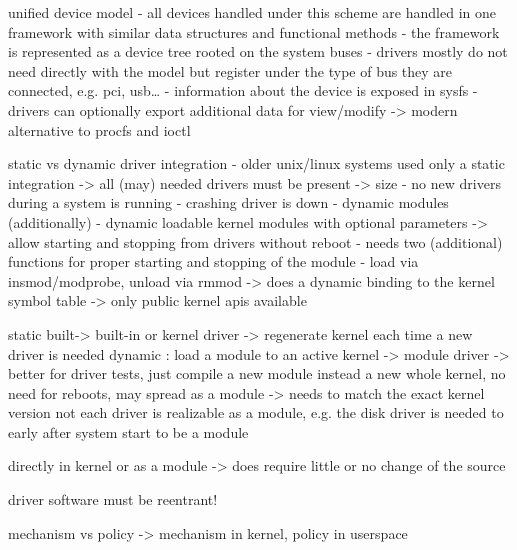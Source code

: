 \cite{lfd430}
unified device model
- all devices handled under this scheme are handled in one framework with similar data structures and functional methods
- the framework is represented as a device tree rooted on the system buses
- drivers mostly do not need directly with the model but register under the type of bus they are connected, e.g. pci, usb\ldots
- information about the device is exposed in sysfs
- drivers can optionally export additional data for view/modify -> modern alternative to procfs and ioctl



static vs dynamic driver integration
- older unix/linux systems used only a static integration -> all (may) needed drivers must be present -> size
    - no new drivers during a system is running
    - crashing driver is down
- dynamic modules (additionally) 
    - dynamic loadable kernel modules with optional parameters -> allow starting and stopping from drivers without reboot
    - needs two (additional) functions for proper starting and stopping of the module
    - load via insmod/modprobe, unload via rmmod -> does a dynamic binding to the kernel symbol table -> only public kernel apis available

\cite{quade2016Linux}
    static built-> built-in or kernel driver -> regenerate kernel each time a new driver is needed
    dynamic : load a module to an active kernel -> module driver -> better for driver tests, just compile a new module instead a new whole kernel, no need for reboots, may spread as a module -> needs to match the exact kernel version
    not each driver is realizable as a module, e.g. the disk driver is needed to early after system start to be a module

\cite{lfd430}
directly in kernel or as a module -> does require little or no change of the source


driver software must be reentrant!

\cite{lfd430}
mechanism vs policy -> mechanism in kernel, policy in userspace

%

